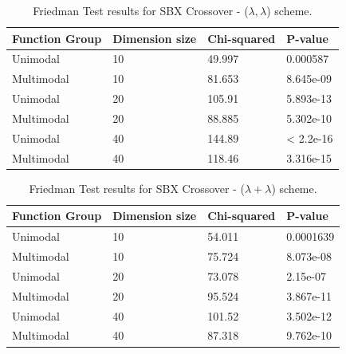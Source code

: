 \begin{table}[h]
	\centering
	\begin{tabular}{|l|l|l|l|}
		\hline
		\textbf{Function Group} & \textbf{Dimension size}      & \textbf{Chi-squared}        & \textbf{P-value}                     \\ \hline
		\multicolumn{1}{|l|}{Unimodal} & \multicolumn{1}{|l|}{10} & \multicolumn{1}{l|}{49.997} & \multicolumn{1}{l|}{0.000587} \\ \hline
		\multicolumn{1}{|l|}{Multimodal} & \multicolumn{1}{|l|}{10} & \multicolumn{1}{l|}{81.653} & \multicolumn{1}{l|}{8.645e-09}  \\ \hline
		\hline
		\multicolumn{1}{|l|}{Unimodal} & \multicolumn{1}{|l|}{20} & \multicolumn{1}{l|}{105.91} & \multicolumn{1}{l|}{5.893e-13} \\ \hline
		\multicolumn{1}{|l|}{Multimodal} & \multicolumn{1}{|l|}{20} & \multicolumn{1}{l|}{88.885} & \multicolumn{1}{l|}{5.302e-10}  \\ \hline
		\hline
		\multicolumn{1}{|l|}{Unimodal} & \multicolumn{1}{|l|}{40} & \multicolumn{1}{l|}{144.89} & \multicolumn{1}{l|}{< 2.2e-16} \\ \hline
		\multicolumn{1}{|l|}{Multimodal} & \multicolumn{1}{|l|}{40} & \multicolumn{1}{l|}{118.46} & \multicolumn{1}{l|}{3.316e-15}  \\ \hline
	\end{tabular}
	\caption{Friedman Test results for SBX Crossover - ($\lambda, \lambda$) scheme.}
	\label{Friedman_test_sbx-a}	
\end{table}

\begin{table}[h]
	\centering
	\begin{tabular}{|l|l|l|l|}
		\hline
		\textbf{Function Group} & \textbf{Dimension size}      & \textbf{Chi-squared}        & \textbf{P-value}                     \\ \hline
		\multicolumn{1}{|l|}{Unimodal} & \multicolumn{1}{|l|}{10} & \multicolumn{1}{l|}{54.011} & \multicolumn{1}{l|}{0.0001639} \\ \hline
		\multicolumn{1}{|l|}{Multimodal} & \multicolumn{1}{|l|}{10} & \multicolumn{1}{l|}{75.724} & \multicolumn{1}{l|}{8.073e-08}  \\ \hline
		\hline
		\multicolumn{1}{|l|}{Unimodal} & \multicolumn{1}{|l|}{20} & \multicolumn{1}{l|}{73.078} & \multicolumn{1}{l|}{2.15e-07} \\ \hline
		\multicolumn{1}{|l|}{Multimodal} & \multicolumn{1}{|l|}{20} & \multicolumn{1}{l|}{95.524} & \multicolumn{1}{l|}{3.867e-11}  \\ \hline
		\hline
		\multicolumn{1}{|l|}{Unimodal} & \multicolumn{1}{|l|}{40} & \multicolumn{1}{l|}{101.52} & \multicolumn{1}{l|}{3.502e-12} \\ \hline
		\multicolumn{1}{|l|}{Multimodal} & \multicolumn{1}{|l|}{40} & \multicolumn{1}{l|}{87.318} & \multicolumn{1}{l|}{9.762e-10}  \\ \hline
	\end{tabular}
	\caption{Friedman Test results for SBX Crossover - ($\lambda + \lambda$) scheme.}
	\label{Friedman_test_sbx-b}	
\end{table}



